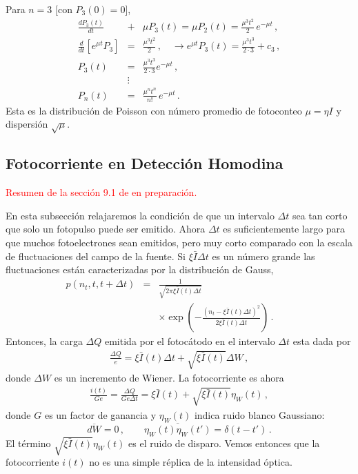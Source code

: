 \documentclass[twocolumn,aps,eqsecnum,showkeys,amsmath]{revtex4}
\begin{document}
Para $n=3$ [con $P_3(0)=0$], 
%
\begin{eqnarray*}
\frac{d P_3(t)}{dt} &+&\mu P_3(t) = \mu P_2(t) 
	=\frac{\mu^3 t^2}{2} \,e^{-\mu t}  	\,, \\	
\frac{d}{dt} \left[ e^{\mu t} P_3  \right] &=& \frac{\mu^3 t^2}{2} 	\,,
	\quad \to e^{\mu t} P_3(t) = \frac{\mu^3 t^3}{2 \cdot 3} +c_3 \,,\\ 
P_3(t) &=& \frac{\mu^3 t^3}{2 \cdot 3} e^{-\mu t} 	\,,	\\
&\vdots& 	\\
P_n(t) &=& \frac{\mu^n t^n}{n!} \,e^{-\mu t}  	\,.
\end{eqnarray*}
Esta es la distribuci\'on de Poisson con n\'umero promedio de 
fotoconteo $\mu = \eta I$ y dispersi\'on $\sqrt{\mu}$. 

\subsection{Fotocorriente en Detecci\'on Homodina} 
\textcolor{red}{Resumen de la secci\'on 9.1 de \cite{Carmichael93} 
en preparaci\'on.}

En esta subsecci\'on relajaremos la condici\'on de que un intervalo 
$\Delta t$ sea tan corto que solo un fotopulso puede ser emitido. Ahora 
$\Delta t$ es suficientemente largo para que muchos fotoelectrones 
sean emitidos, pero muy corto comparado con la escala de fluctuaciones 
del campo de la fuente. Si $\xi \bar{I} \Delta t$ es un n\'umero grande las 
fluctuaciones est\'an caracterizadas por la distribuci\'on de Gauss,    
%
\begin{eqnarray}
p(n_t,t,t+\Delta t) &=& \frac{1}{\sqrt{ 2\pi \xi \bar{I}(t) \Delta t}} 	\nonumber \\
	&& \times \exp{ \left( - \frac{(n_t -\xi \bar{I}(t) \Delta t)^2}
	{2\xi \bar{I}(t) \Delta t} \right) } \,. \qquad
\end{eqnarray}
Entonces, la carga $\Delta Q$ emitida por el fotoc\'atodo en el intervalo 
$\Delta t$ esta dada por 
\begin{eqnarray}
\frac{\Delta Q}{e} = \xi \bar{I}(t) \Delta t +\sqrt{ \xi \bar{I}(t)} \Delta W \,, 
\end{eqnarray}
donde $\Delta W$ es un incremento de Wiener. La fotocorriente es ahora 
\begin{eqnarray} 	\label{eq:photocurrent}
\frac{i(t)}{Ge} = \frac{\Delta Q}{G e \Delta t} 
	= \xi \bar{I}(t) +\sqrt{ \xi \bar{I}(t)} \eta_W(t) \,, 
\end{eqnarray}
donde $G$ es un factor de ganancia y $\eta_W(t)$ indica ruido blanco 
Gaussiano: 
%
\begin{equation} 	
\overline{dW} =0 \,,  \qquad \overline{\eta_W(t) \eta_W(t')} = \delta(t-t') \,.
\end{equation}
El t\'ermino $\sqrt{ \xi \bar{I}(t)} \eta_W(t)$ es el ruido de disparo. 
Vemos entonces que la fotocorriente $i(t)$ no es una simple r\'eplica 
de la intensidad \'optica.
\end{document}
